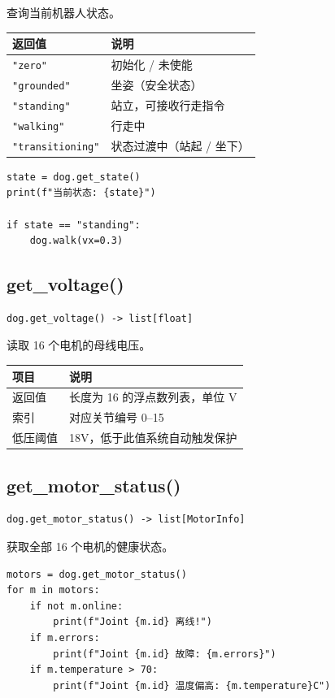 \documentclass[a4paper,11pt,openany]{book}
\begin{document}
查询当前机器人状态。

\begin{longtable}{ll}
\toprule
返回值 & 说明 \\
\midrule
\endhead
\texttt{"zero"} & 初始化 / 未使能 \\
\texttt{"grounded"} & 坐姿（安全状态） \\
\texttt{"standing"} & 站立，可接收行走指令 \\
\texttt{"walking"} & 行走中 \\
\texttt{"transitioning"} & 状态过渡中（站起 / 坐下） \\
\bottomrule
\end{longtable}

\begin{lstlisting}[style=python]
state = dog.get_state()
print(f"当前状态: {state}")

if state == "standing":
    dog.walk(vx=0.3)
\end{lstlisting}

\subsection{get\_voltage()}

\begin{lstlisting}[style=python,numbers=none]
dog.get_voltage() -> list[float]
\end{lstlisting}

读取 16 个电机的母线电压。

\begin{longtable}{ll}
\toprule
项目 & 说明 \\
\midrule
\endhead
返回值 & 长度为 16 的浮点数列表，单位 V \\
索引 & 对应关节编号 0--15 \\
低压阈值 & 18V，低于此值系统自动触发保护 \\
\bottomrule
\end{longtable}

\subsection{get\_motor\_status()}

\begin{lstlisting}[style=python,numbers=none]
dog.get_motor_status() -> list[MotorInfo]
\end{lstlisting}

获取全部 16 个电机的健康状态。

\begin{lstlisting}[style=python]
motors = dog.get_motor_status()
for m in motors:
    if not m.online:
        print(f"Joint {m.id} 离线!")
    if m.errors:
        print(f"Joint {m.id} 故障: {m.errors}")
    if m.temperature > 70:
        print(f"Joint {m.id} 温度偏高: {m.temperature}C")
\end{lstlisting}
\end{document}
